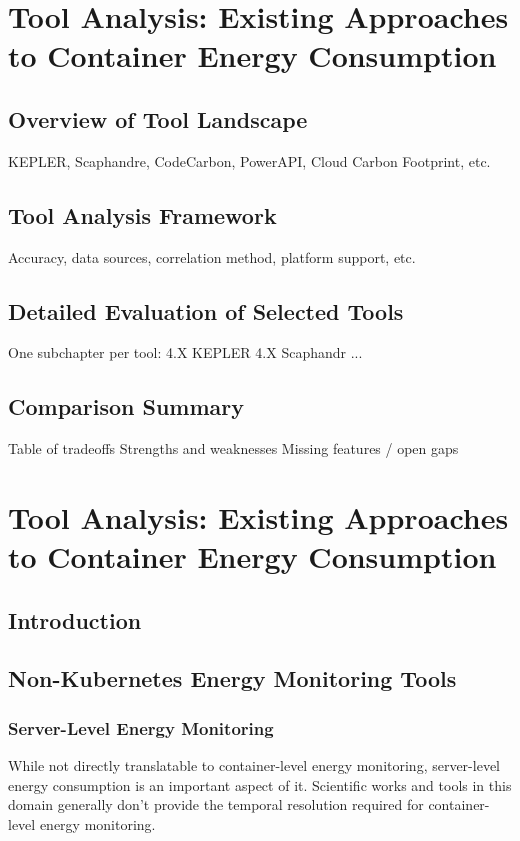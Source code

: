 \chapter{Tool Analysis: Existing Approaches to Container Energy Consumption} %
\label{Chapter4}

\section{Overview of Tool Landscape}
            KEPLER, Scaphandre, CodeCarbon, PowerAPI, Cloud Carbon Footprint, etc.
\section{Tool Analysis Framework}
        Accuracy, data sources, correlation method, platform support, etc.
\section{Detailed Evaluation of Selected Tools}
        One subchapter per tool:
            4.X KEPLER
            4.X Scaphandr
            ...
\section{Comparison Summary}
        Table of tradeoffs
        Strengths and weaknesses
        Missing features / open gaps



\chapter{Tool Analysis: Existing Approaches to Container Energy Consumption}
\label{chap:tool-analysis}

\section{Introduction}
\label{sec:tool-intro}

\section{Non-Kubernetes Energy Monitoring Tools}
\label{sec:non-k8s-tools}
\subsection{Server-Level Energy Monitoring}
\label{sec:server-tools}
While not directly translatable to container-level energy monitoring, server-level energy consumption is an important aspect of it. Scientific works and tools in this domain generally don't provide the temporal resolution required for container-level energy monitoring.

